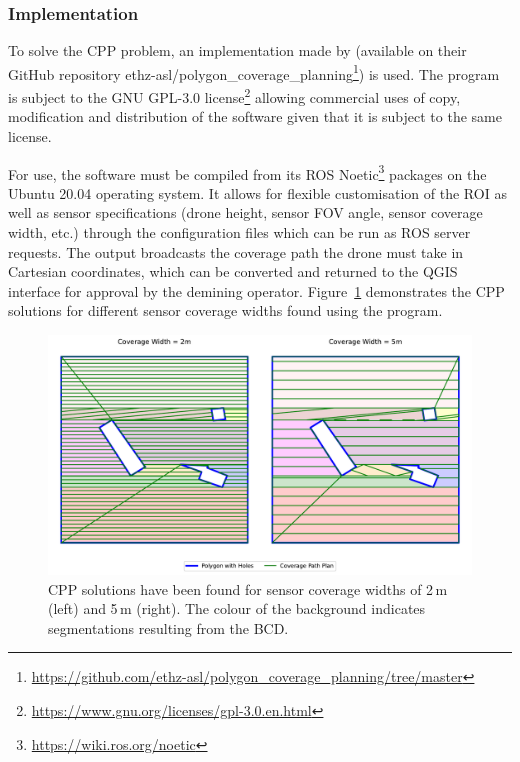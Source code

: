 \subsubsection{Implementation}

To solve the \gls{CPP} problem, an implementation made by \cite{bahnemann2021cpp} (available on their GitHub repository ethz-asl/polygon\_coverage\_planning\footnote{\url{https://github.com/ethz-asl/polygon_coverage_planning/tree/master}}) is used. The program is subject to the GNU GPL-3.0 license\footnote{\url{https://www.gnu.org/licenses/gpl-3.0.en.html}} allowing commercial uses of copy, modification and distribution of the software given that it is subject to the same license. 

For use, the software must be compiled from its ROS Noetic\footnote{\url{https://wiki.ros.org/noetic}} packages on the Ubuntu 20.04 operating system. It allows for flexible customisation of the \gls{ROI} as well as sensor specifications (drone height, sensor FOV angle, sensor coverage width, etc.) through the configuration files which can be run as ROS server requests. The output broadcasts the coverage path the drone must take in Cartesian coordinates, which can be converted and returned to the \gls{QGIS} interface for approval by the demining operator. Figure~\ref{fig:msp_bahnemann} demonstrates the \gls{CPP} solutions for different sensor coverage widths found using the program. 

\begin{figure}[h!]
    \centering
    \includegraphics[width=\linewidth]{figs/Jihwan/CPP_diff_widths.pdf}
    \caption[CPP Solution Examples]
    {\gls{CPP} solutions have been found for sensor coverage widths of 2\,m (left) and 5\,m (right). The colour of the background indicates segmentations resulting from the \gls{BCD}.}
    \label{fig:msp_bahnemann}
\end{figure}

